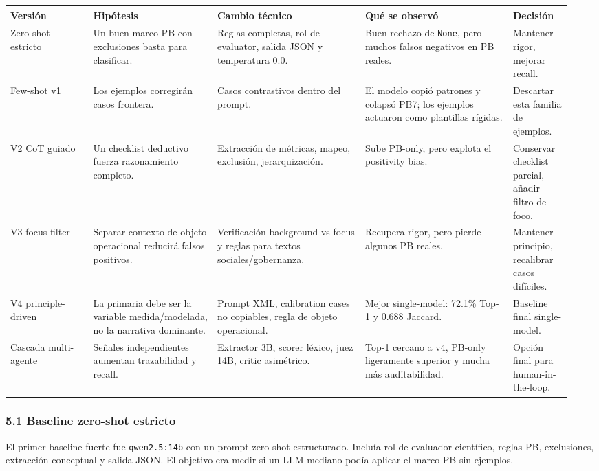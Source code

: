 \begin{center}
\scriptsize
\setlength{\tabcolsep}{3pt}
\renewcommand{\arraystretch}{1.18}
\begin{tabular}{p{0.14\linewidth}p{0.21\linewidth}p{0.25\linewidth}p{0.25\linewidth}p{0.10\linewidth}}
\toprule
Versión & Hipótesis & Cambio técnico & Qué se observó & Decisión \\
\midrule
Zero-shot estricto & Un buen marco PB con exclusiones basta para clasificar. & Reglas completas, rol de evaluator, salida JSON y temperatura 0.0. & Buen rechazo de \texttt{None}, pero muchos falsos negativos en PB reales. & Mantener rigor, mejorar recall. \\
Few-shot v1 & Los ejemplos corregirán casos frontera. & Casos contrastivos dentro del prompt. & El modelo copió patrones y colapsó PB7; los ejemplos actuaron como plantillas rígidas. & Descartar esta familia de ejemplos. \\
V2 CoT guiado & Un checklist deductivo fuerza razonamiento completo. & Extracción de métricas, mapeo, exclusión, jerarquización. & Sube PB-only, pero explota el positivity bias. & Conservar checklist parcial, añadir filtro de foco. \\
V3 focus filter & Separar contexto de objeto operacional reducirá falsos positivos. & Verificación background-vs-focus y reglas para textos sociales/gobernanza. & Recupera rigor, pero pierde algunos PB reales. & Mantener principio, recalibrar casos difíciles. \\
V4 principle-driven & La primaria debe ser la variable medida/modelada, no la narrativa dominante. & Prompt XML, calibration cases no copiables, regla de objeto operacional. & Mejor single-model: 72.1\% Top-1 y 0.688 Jaccard. & Baseline final single-model. \\
Cascada multi-agente & Señales independientes aumentan trazabilidad y recall. & Extractor 3B, scorer léxico, juez 14B, critic asimétrico. & Top-1 cercano a v4, PB-only ligeramente superior y mucha más auditabilidad. & Opción final para human-in-the-loop. \\
\bottomrule
\end{tabular}
\end{center}

\subsubsection{5.1 Baseline zero-shot estricto}

El primer baseline fuerte fue \texttt{qwen2.5:14b} con un prompt zero-shot estructurado. Incluía rol de evaluador científico, reglas PB, exclusiones, extracción conceptual y salida JSON. El objetivo era medir si un LLM mediano podía aplicar el marco PB sin ejemplos.

